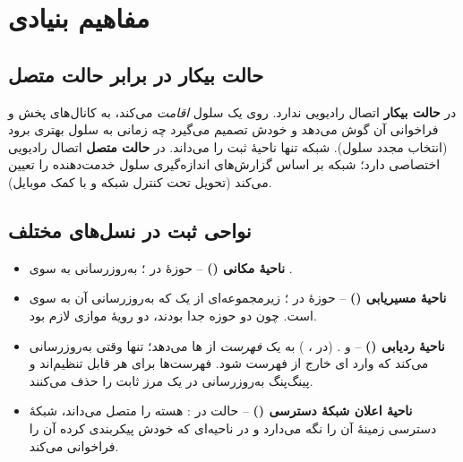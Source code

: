 \documentclass[11pt,a4paper]{article}
\begin{document}
\section{مفاهیم بنیادی}

\subsection{حالت بیکار در برابر حالت متصل}
در \textbf{حالت بیکار}  اتصال رادیویی ندارد. روی یک سلول \emph{اقامت} می‌کند، به کانال‌های
پخش و فراخوانی آن گوش می‌دهد و خودش تصمیم می‌گیرد چه زمانی به سلول بهتری برود (انتخاب مجدد
سلول). شبکه تنها ناحیهٔ ثبت  را می‌داند. در \textbf{حالت متصل}  اتصال رادیویی
اختصاصی دارد؛ شبکه بر اساس گزارش‌های اندازه‌گیری  سلول خدمت‌دهنده را تعیین می‌کند (تحویل
تحت کنترل شبکه و با کمک موبایل).

\subsection{نواحی ثبت در نسل‌های مختلف}
\begin{itemize}
  \item \textbf{ناحیهٔ مکانی ()} -- حوزهٔ  در ؛ به‌روزرسانی به سوی .
  \item \textbf{ناحیهٔ مسیریابی ()} -- حوزهٔ  در ؛ زیرمجموعه‌ای از یک
         که به‌روزرسانی آن به سوی  است. چون دو حوزه جدا بودند، دو رویهٔ موازی لازم بود.
  \item \textbf{ناحیهٔ ردیابی ()} --  و .  (در ، ) به
         یک \emph{فهرست} از ها می‌دهد؛  تنها وقتی به‌روزرسانی می‌کند که وارد
        ای خارج از فهرست شود. فهرست‌ها برای هر  قابل تنظیم‌اند و پینگ‌پنگ
        به‌روزرسانی در یک مرز ثابت را حذف می‌کنند.
  \item \textbf{ناحیهٔ اعلان شبکهٔ دسترسی ()} -- حالت  در : هسته
         را متصل می‌داند، شبکهٔ دسترسی زمینهٔ آن را نگه می‌دارد و در ناحیه‌ای که خودش
        پیکربندی کرده آن را فراخوانی می‌کند.
\end{itemize}

\begin{acnfigure}
  \caption{نواحی ثبت در نسل‌های پیاپی.}
  \label{fig:areas}
\end{acnfigure}
\end{document}
